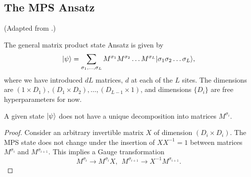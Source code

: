 \documentclass{article}
\begin{document}
\subsection{The MPS Ansatz}
(Adapted from \cite{schollwockDensitymatrixRenormalizationGroup2011}.)
\begin{definition}
    The general matrix product state Ansatz is given by
    \begin{equation}
    \label{eq:mps-ansatz}
        |\psi\rangle=\sum_{\sigma_1,\dots,\sigma_L}M^{\sigma_1}M^{\sigma_2}\dots M^{\sigma_L}|\sigma_1\sigma_2\dots\sigma_L\rangle,
    \end{equation}
    where we have introduced $dL$ matrices, $d$ at each of the $L$ sites. The dimensions are $(1\times D_1),(D_1\times D_2),\dots,(D_{L-1}\times 1)$, and dimensions $\{D_i\}$ are free hyperparameters for now.
\end{definition}

\begin{theorem}
    A given state $|\psi\rangle$ does not have a unique decomposition into matrices $M^{\sigma_i}$.
\end{theorem}
\begin{proof}
    Consider an arbitrary invertible matrix $X$ of dimension $(D_i\times D_i)$. The MPS state does not change under the insertion of $XX^{-1}=1$ between matrices $M^{\sigma_i}$ and $M^{\sigma_{i+1}}$. This implies a Gauge transformation
    \begin{equation}
        M^{\sigma_i}\rightarrow M^{\sigma_i}X,\ \ M^{\sigma_{i+1}}\rightarrow X^{-1}M^{\sigma_{i+1}}.
    \end{equation}
\end{proof}
\end{document}
